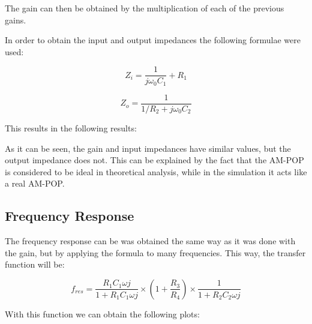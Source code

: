 The gain can then be obtained by the multiplication of each of the previous gains.
 

 
\vspace{1cm}

In order to obtain the input and output impedances the following formulae were used:
\vspace{0.5cm}
 
\[Z_i = \frac{1}{j\omega _0 C_1} + R_1\tag{7}\label{7}\]
 
 \[Z_o = \frac{1}{1/R_2 + j \omega _0 C_2}\tag{8}\label{8}\]



\vspace{1cm}

This results in the following results:

\vspace{0.5cm}
\begin{center}
\end{center}
\vspace{1cm}

As it can be seen, the gain and input impedances have similar values, but the output impedance does not. This can be explained by the fact that the AM-POP is considered to be ideal in theoretical analysis, while in the simulation it acts like a real AM-POP.  

\subsection{Frequency Response}

\indent

The frequency response can be was obtained the same way as it was done with the gain, but by applying the formula to many frequencies. This way, the transfer function will be:

\vspace{0.5cm}

\[f_{res}=\frac{R_1 C_1 \omega j}{1 + R_1 C_1 \omega j}\times(1 + \frac{R_3}{R_4}) \times \frac{1}{1+ R_2 C_2 \omega j} \tag{9}\label{9}\]

\vspace{0.5cm}
With this function we can obtain the following plots:

\vspace{0.5cm}

\begin{figure}[h]
    \centering
{}
  \hfill
{}
\end{figure}

